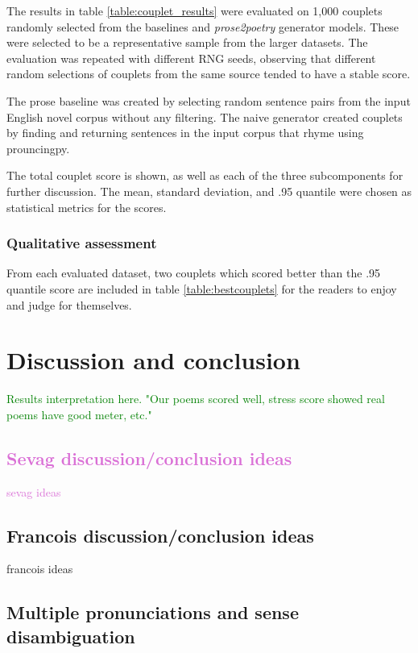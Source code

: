 \documentclass[11pt,a4paper]{article}
\begin{document}
The results in table \ref{table:couplet_results} were evaluated on 1,000 couplets randomly selected from the baselines and \textit{prose2poetry} generator models. These were selected to be a representative sample from the larger datasets. The evaluation was repeated with different RNG seeds, observing that different random selections of couplets from the same source tended to have a stable score.

The prose baseline was created by selecting random sentence pairs from the input English novel corpus without any filtering. The naive generator created couplets by finding and returning sentences in the input corpus that rhyme using prouncingpy.

The total couplet score is shown, as well as each of the three subcomponents for further discussion. The mean, standard deviation, and .95 quantile were chosen as statistical metrics for the scores.

\subsubsection{Qualitative assessment}

From each evaluated dataset, two couplets which scored better than the .95 quantile score are included in table \ref{table:bestcouplets} for the readers to enjoy and judge for themselves.

\section{Discussion and conclusion}
\label{sec:discconc}

\textcolor{green}{
Results interpretation here. "Our poems scored well, stress score showed real poems have good meter, etc."
}

\textcolor{Orchid}{
\subsection{Sevag discussion/conclusion ideas}
sevag ideas
}

\textcolor{Dandelion}{
\subsection{Francois discussion/conclusion ideas}
francois ideas
}

\subsection{Multiple pronunciations and sense disambiguation}
\label{sec:synset}
\end{document}
